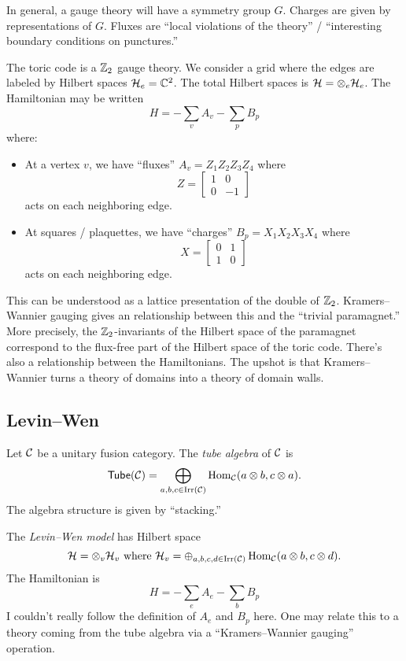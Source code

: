 \documentclass{amsart}
\begin{document}
In general, a gauge theory will have a symmetry group $G$.
Charges are given by representations of $G$.
Fluxes are ``local violations of the theory'' / ``interesting boundary conditions on punctures.''

\begin{ex}
  The toric code is a $\mathbb{Z}_2$ gauge theory.
  We consider a grid where the edges are labeled by Hilbert spaces $\mathcal{H}_e = \mathbb{C}^2$.
  The total Hilbert spaces is $\mathcal{H} = \otimes_e \mathcal{H}_e$.
  The Hamiltonian may be written
  \[
    H = -\sum_v A_v - \sum_p B_p
  \]
  where:
  \begin{itemize}
    \item At a vertex $v$, we have ``fluxes'' $A_v = Z_1 Z_2 Z_3 Z_4$ where
      \[
        Z = \begin{bmatrix}
          1 & 0 \\
          0 & -1
        \end{bmatrix}
      \]
      acts on each neighboring edge.
    \item At squares / plaquettes, we have ``charges'' $B_p = X_1 X_2 X_3 X_4$ where
      \[
        X = \begin{bmatrix}
          0 & 1 \\
          1 & 0
        \end{bmatrix}
      \]
      acts on each neighboring edge.
  \end{itemize}
  This can be understood as a lattice presentation of the double of $\mathbb{Z}_2$.
  Kramers--Wannier gauging gives an relationship between this and the ``trivial paramagnet.''
  More precisely, the $\mathbb{Z}_2$-invariants of the Hilbert space of the paramagnet correspond to the flux-free part of the Hilbert space of the toric code.
  There's also a relationship between the Hamiltonians.
  The upshot is that Kramers--Wannier turns a theory of domains into a theory of domain walls.
\end{ex}

\subsection{Levin--Wen}

Let $\mathcal{C}$ be a unitary fusion category.
The \emph{tube algebra} of $\mathcal{C}$ is 
\[
  \operatorname{\mathsf{Tube}}(\mathcal{C}) = \bigoplus_{a,b,c \in \operatorname{Irr}(\mathcal{C})} \operatorname{Hom}_{\mathcal{C}}(a \otimes b, c \otimes a).
\]
The algebra structure is given by ``stacking.''

The \emph{Levin--Wen model} has Hilbert space
\[
  \mathcal{H} = \otimes_v \mathcal{H}_v \textrm{ where } \mathcal{H}_v = \oplus_{a,b,c,d \in \operatorname{Irr}(\mathcal{C})} \operatorname{Hom}_{\mathcal{C}}(a \otimes b, c \otimes d).
\]
The Hamiltonian is
\[
  H= -\sum_e A_e - \sum_b B_p
\]
I couldn't really follow the definition of $A_e$ and $B_p$ here.
One may relate this to a theory coming from the tube algebra via a ``Kramers--Wannier gauging'' operation.
\end{document}
